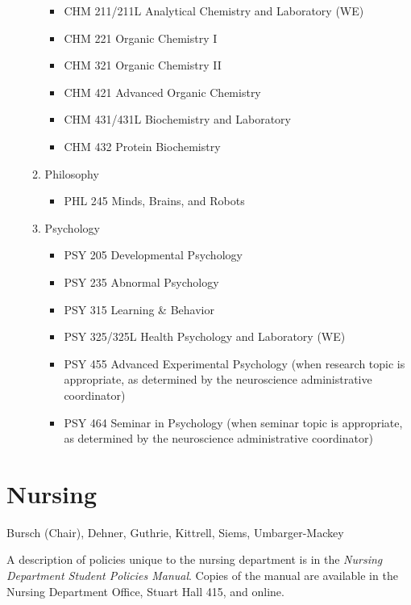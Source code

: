 \documentclass[
  letterpaper,
]{scrbook}
\providecommand{\tightlist}{%
  \setlength{\itemsep}{0pt}\setlength{\parskip}{0pt}}
\begin{document}
\begin{enumerate}
\begin{enumerate}
    \begin{itemize}
    \tightlist
    \item
      CHM 211/211L Analytical Chemistry and Laboratory (WE)
    \item
      CHM 221 Organic Chemistry I
    \item
      CHM 321 Organic Chemistry II
    \item
      CHM 421 Advanced Organic Chemistry
    \item
      CHM 431/431L Biochemistry and Laboratory
    \item
      CHM 432 Protein Biochemistry
    \end{itemize}
  \item
    Philosophy

    \begin{itemize}
    \tightlist
    \item
      PHL 245 Minds, Brains, and Robots
    \end{itemize}
  \item
    Psychology

    \begin{itemize}
    \tightlist
    \item
      PSY 205 Developmental Psychology
    \item
      PSY 235 Abnormal Psychology
    \item
      PSY 315 Learning \& Behavior
    \item
      PSY 325/325L Health Psychology and Laboratory (WE)
    \item
      PSY 455 Advanced Experimental Psychology (when research topic is
      appropriate, as determined by the neuroscience administrative
      coordinator)
    \item
      PSY 464 Seminar in Psychology (when seminar topic is appropriate,
      as determined by the neuroscience administrative coordinator)
    \end{itemize}
  \end{enumerate}
\end{enumerate}

\section{Nursing}\label{nursing}

Bursch (Chair), Dehner, Guthrie, Kittrell, Siems, Umbarger-Mackey

A description of policies unique to the nursing department is in the
\emph{Nursing Department Student Policies Manual}. Copies of the manual
are available in the Nursing Department Office, Stuart Hall 415, and
online.
\end{document}
